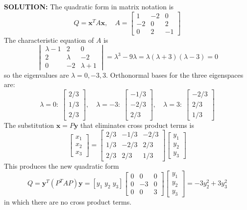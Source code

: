 \documentclass{article}
\begin{document}
\textbf{SOLUTION:} The quadratic form in matrix notation is
\[
  Q = \mathbf{x}^T A\mathbf{x}, \quad
  A=\begin{bmatrix}1&-2&0\\-2&0&2\\0&2&-1\end{bmatrix}
\]
The characteristic equation of $A$ is
\[
  \begin{vmatrix}\lambda-1&2&0\\2&\lambda&-2\\0&-2&\lambda+1\end{vmatrix}
  = \lambda^3-9\lambda = \lambda(\lambda+3)(\lambda-3) = 0
\]
so the eigenvalues are $\lambda=0,-3,3$. Orthonormal bases for the three eigenspaces are:
\[
  \lambda=0:\;\begin{bmatrix}2/3\\1/3\\2/3\end{bmatrix},\quad
  \lambda=-3:\;\begin{bmatrix}-1/3\\-2/3\\2/3\end{bmatrix},\quad
  \lambda=3:\;\begin{bmatrix}-2/3\\2/3\\1/3\end{bmatrix}
\]
The substitution $\mathbf{x}=P\mathbf{y}$ that eliminates cross product terms is
\[
  \begin{bmatrix}x_1\\x_2\\x_3\end{bmatrix}
  =\begin{bmatrix}2/3&-1/3&-2/3\\1/3&-2/3&2/3\\2/3&2/3&1/3\end{bmatrix}
  \begin{bmatrix}y_1\\y_2\\y_3\end{bmatrix}
\]
This produces the new quadratic form
\[
  Q = \mathbf{y}^T(P^T AP)\mathbf{y}
  = [y_1\;y_2\;y_3]\begin{bmatrix}0&0&0\\0&-3&0\\0&0&3\end{bmatrix}
  \begin{bmatrix}y_1\\y_2\\y_3\end{bmatrix}
  = -3y_2^2+3y_3^2
\]
in which there are no cross product terms.
\end{document}
